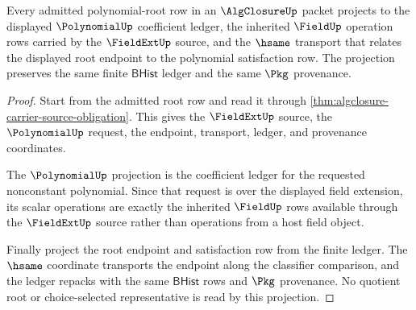 \begin{theorem}
\label{thm:algclosure-polynomial-root-ledger-obligation}
Every admitted polynomial-root row in an $\AlgClosureUp$ packet projects to
the displayed $\PolynomialUp$ coefficient ledger, the inherited $\FieldUp$
operation rows carried by the $\FieldExtUp$ source, and the $\hsame$ transport
that relates the displayed root endpoint to the polynomial satisfaction row.
The projection preserves the same finite $\mathsf{BHist}$ ledger and the same
$\Pkg$ provenance.
\end{theorem}
\begin{proof}
Start from the admitted root row and read it through
\autoref{thm:algclosure-carrier-source-obligation}. This gives the
$\FieldExtUp$ source, the $\PolynomialUp$ request, the endpoint, transport,
ledger, and provenance coordinates.

The $\PolynomialUp$ projection is the coefficient ledger for the requested
nonconstant polynomial. Since that request is over the displayed field
extension, its scalar operations are exactly the inherited $\FieldUp$ rows
available through the $\FieldExtUp$ source rather than operations from a host
field object.

Finally project the root endpoint and satisfaction row from the finite ledger.
The $\hsame$ coordinate transports the endpoint along the classifier
comparison, and the ledger repacks with the same $\mathsf{BHist}$ rows and
$\Pkg$ provenance. No quotient root or choice-selected representative is read
by this projection.
\end{proof}

